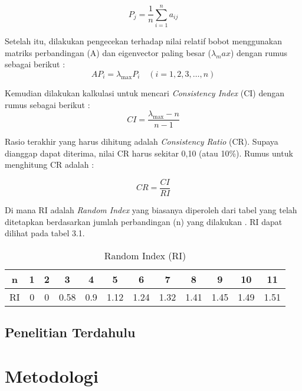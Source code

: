 \documentclass[journal,article,submit,pdftex,moreauthors]{Definitions/mdpi}
\begin{document}
\[
P_j = \frac{1}{n} \sum_{i=1}^{n} a_{ij}
\]


Setelah itu, dilakukan pengecekan terhadap nilai relatif bobot menggunakan matriks perbandingan (A) dan eigenvector paling besar ($λ_max$) dengan rumus sebagai berikut \cite{Singh2019}:
\[
AP_i = \lambda_{\text{max}} P_i \quad (i = 1, 2, 3, \ldots, n)
\]


Kemudian dilakukan kalkulasi untuk mencari \textit{Consistency Index} (CI) dengan rumus sebagai berikut \cite{Singh2019}:
\[
CI = \frac{\lambda_{\text{max}} - n}{n - 1}
\]



Rasio terakhir yang harus dihitung adalah \textit{Consistency Ratio} (CR). Supaya dianggap dapat diterima, nilai CR harus sekitar 0,10 (atau 10\%). Rumus untuk menghitung CR adalah \cite{Singh2019}:

\[
CR = \frac{CI}{RI}
\]



Di mana RI adalah \textit{Random Index} yang biasanya diperoleh dari tabel yang telah ditetapkan berdasarkan jumlah perbandingan (n) yang dilakukan \cite{Singh2019}. RI dapat dilihat pada tabel 3.1.

\begin{table}[h]
    \centering
    \caption{Random Index (RI)}
    \begin{tabular}{|c|ccccccccccc|}
        \hline
        n & 1 & 2 & 3 & 4 & 5 & 6 & 7 & 8 & 9 & 10 & 11 \\
        \hline
        RI & 0 & 0 & 0.58 & 0.9 & 1.12 & 1.24 & 1.32 & 1.41 & 1.45 & 1.49 & 1.51 \\
        \hline
    \end{tabular}
\end{table}


\subsection{Penelitian Terdahulu}


\section{Metodologi}

\end{document}
